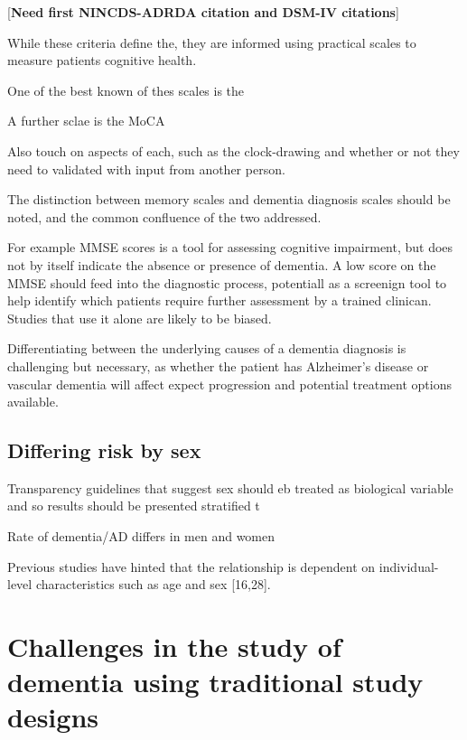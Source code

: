 \documentclass[a4paper, twoside]{templates/ociamthesis}
\begin{document}
{[}\textbf{Need first NINCDS-ADRDA citation and DSM-IV citations}{]}

While these criteria define the, they are informed using practical scales to measure patients cognitive health.

One of the best known of thes scales is the

A further sclae is the MoCA

Also touch on aspects of each, such as the clock-drawing and whether or not they need to validated with input from another person.

The distinction between memory scales and dementia diagnosis scales should be noted, and the common confluence of the two addressed.

For example MMSE scores is a tool for assessing cognitive impairment, but does not by itself indicate the absence or presence of dementia. A low score on the MMSE should feed into the diagnostic process, potentiall as a screenign tool to help identify which patients require further assessment by a trained clinican. Studies that use it alone are likely to be biased.

Differentiating between the underlying causes of a dementia diagnosis is challenging but necessary, as whether the patient has Alzheimer's disease or vascular dementia will affect expect progression and potential treatment options available.

\hypertarget{differing-risk-by-sex}{%
\subsection{Differing risk by sex}\label{differing-risk-by-sex}}

Transparency guidelines that suggest sex should eb treated as biological variable and so results should be presented stratified t

Rate of dementia/AD differs in men and women

Previous studies have hinted that the relationship is dependent on individual-level characteristics such as age and sex {[}16,28{]}.

\hypertarget{challenges-in-the-study-of-dementia-using-traditional-study-designs}{%
\section{Challenges in the study of dementia using traditional study designs}\label{challenges-in-the-study-of-dementia-using-traditional-study-designs}}
\end{document}
